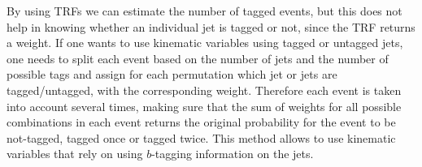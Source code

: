 By using TRFs we can estimate the number of tagged events, but this
does not help in knowing whether an individual jet is tagged or not,
since the TRF returns a weight. If one wants to use kinematic
variables using tagged or untagged jets, one needs to split each event
based on the number of jets and the number of possible tags and assign
for each permutation which jet or jets are tagged/untagged, with the
corresponding weight. Therefore each event is taken into account
several times, making sure that the sum of weights for all possible
combinations in each event returns the original probability for the
event to be not-tagged, tagged once or tagged twice.  This method
allows to use kinematic variables that rely on using $b$-tagging
information on the jets.
 
